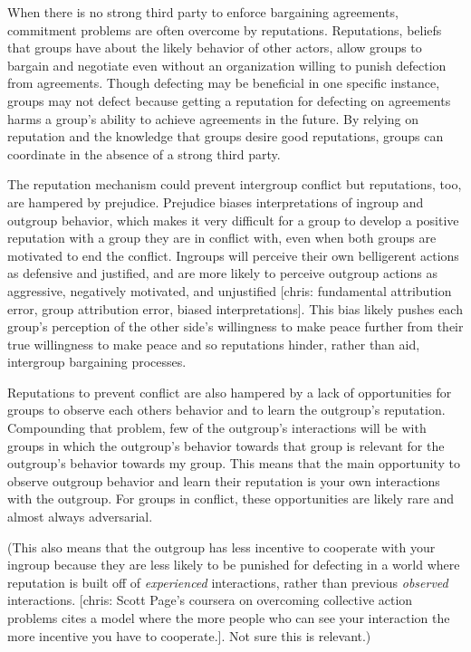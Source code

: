 \documentclass[11pt]{article}
\begin{document}
When there is no strong third party to enforce bargaining agreements,
commitment problems are often overcome by reputations. Reputations,
beliefs that groups have about the likely behavior of other actors,
allow groups to bargain and negotiate even without an organization
willing to punish defection from agreements. Though defecting may be
beneficial in one specific instance, groups may not defect because
getting a reputation for defecting on agreements harms a group's ability
to achieve agreements in the future. By relying on reputation and the
knowledge that groups desire good reputations, groups can coordinate in
the absence of a strong third party.

The reputation mechanism could prevent intergroup conflict but
reputations, too, are hampered by prejudice. Prejudice biases
interpretations of ingroup and outgroup behavior, which makes it very
difficult for a group to develop a positive reputation with a group they
are in conflict with, even when both groups are motivated to end the
conflict. Ingroups will perceive their own belligerent actions as
defensive and justified, and are more likely to perceive outgroup
actions as aggressive, negatively motivated, and unjustified {[}chris:
fundamental attribution error, group attribution error, biased
interpretations{]}. This bias likely pushes each group's perception of
the other side's willingness to make peace further from their true
willingness to make peace and so reputations hinder, rather than aid,
intergroup bargaining processes.

Reputations to prevent conflict are also hampered by a lack of
opportunities for groups to observe each others behavior and to learn
the outgroup's reputation. Compounding that problem, few of the
outgroup's interactions will be with groups in which the outgroup's
behavior towards that group is relevant for the outgroup's behavior
towards my group. This means that the main opportunity to observe
outgroup behavior and learn their reputation is your own interactions
with the outgroup. For groups in conflict, these opportunities are
likely rare and almost always adversarial.

(This also means that the outgroup has less incentive to cooperate with
your ingroup because they are less likely to be punished for defecting
in a world where reputation is built off of \emph{experienced}
interactions, rather than previous \emph{observed} interactions.
{[}chris: Scott Page's coursera on overcoming collective action problems
cites a model where the more people who can see your interaction the
more incentive you have to cooperate.{]}. Not sure this is relevant.)
\end{document}
